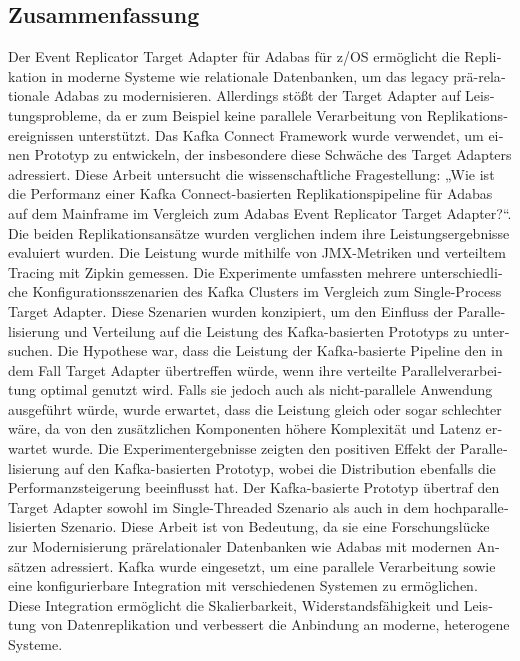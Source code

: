 \begin{otherlanguage}{ngerman}
	\chapter*{Zusammenfassung}
    Der Event Replicator Target Adapter für Adabas für z/OS ermöglicht die Replikation in moderne Systeme wie relationale Datenbanken, um das legacy prä-relationale Adabas zu modernisieren. Allerdings stößt der Target Adapter auf Leistungsprobleme, da er zum Beispiel keine parallele Verarbeitung von Replikationsereignissen unterstützt. Das Kafka Connect Framework wurde verwendet, um einen Prototyp zu entwickeln, der insbesondere diese Schwäche des Target Adapters adressiert.
    Diese Arbeit untersucht die wissenschaftliche Fragestellung: „Wie ist die Performanz einer Kafka Connect-basierten Replikationspipeline für Adabas auf dem Mainframe im Vergleich zum Adabas Event Replicator Target Adapter?“. Die beiden Replikationsansätze wurden verglichen indem ihre Leistungsergebnisse evaluiert wurden. Die Leistung wurde mithilfe von JMX-Metriken und verteiltem Tracing mit Zipkin gemessen. Die Experimente umfassten mehrere unterschiedliche Konfigurationsszenarien des Kafka Clusters im Vergleich zum Single-Process Target Adapter. Diese Szenarien wurden konzipiert, um den Einfluss der Parallelisierung und Verteilung auf die Leistung des Kafka-basierten Prototyps zu untersuchen.
    Die Hypothese war, dass die Leistung der Kafka-basierte Pipeline den in dem Fall Target Adapter übertreffen würde, wenn ihre verteilte Parallelverarbeitung optimal genutzt wird. Falls sie jedoch auch als nicht-parallele Anwendung ausgeführt würde, wurde erwartet, dass die Leistung gleich oder sogar schlechter wäre, da von den zusätzlichen Komponenten höhere Komplexität und Latenz erwartet wurde. Die Experimentergebnisse zeigten den positiven Effekt der Parallelisierung auf den Kafka-basierten Prototyp, wobei die Distribution ebenfalls die Performanzsteigerung beeinflusst hat. Der Kafka-basierte Prototyp übertraf den Target Adapter sowohl im Single-Threaded Szenario als auch in dem hochparallelisierten Szenario.
    Diese Arbeit ist von Bedeutung, da sie eine Forschungslücke zur Modernisierung prärelationaler Datenbanken wie Adabas mit modernen Ansätzen adressiert. Kafka wurde eingesetzt, um eine parallele Verarbeitung sowie eine konfigurierbare Integration mit verschiedenen Systemen zu ermöglichen. Diese Integration ermöglicht die Skalierbarkeit, Widerstandsfähigkeit und Leistung von Datenreplikation und verbessert die Anbindung an moderne, heterogene Systeme.

\end{otherlanguage}
